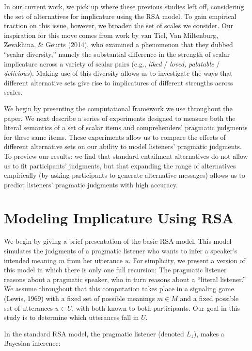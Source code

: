\documentclass[10pt, letterpaper]{article}
\begin{document}
In our current work, we pick up where these previous studies left off,
considering the set of alternatives for implicature using the RSA model.
To gain empirical traction on this issue, however, we broaden the set of
scales we consider. Our inspiration for this move comes from work by
{van Tiel}, Van Miltenburg, Zevakhina, \& Geurts (2014), who examined a
phenomenon that they dubbed ``scalar diversity,'' namely the substantial
difference in the strength of scalar implicature across a variety of
scalar pairs (e.g., \emph{liked} / \emph{loved,} \emph{palatable} /
\emph{delicious}). Making use of this diversity allows us to investigate
the ways that different alternative sets give rise to implicatures of
different strengths across scales.

We begin by presenting the computational framework we use throughout the
paper. We next describe a series of experiments designed to measure both
the literal semantics of a set of scalar items and comprehenders'
pragmatic judgments for these same items. These experiments allow us to
compare the effects of different alternative sets on our ability to
model listeners' pragmatic judgments. To preview our results: we find
that standard entailment alternatives do not allow us to fit
participants' judgments, but that expanding the range of alternatives
empirically (by asking participants to generate alternative messages)
allows us to predict listeners' pragmatic judgments with high accuracy.

\section{Modeling Implicature Using
RSA}\label{modeling-implicature-using-rsa}

We begin by giving a brief presentation of the basic RSA model. This
model simulates the judgments of a pragmatic listener who wants to infer
a speaker's intended meaning \(m\) from her utterance \(u\). For
simplicity, we present a version of this model in which there is only
one full recursion: The pragmatic listener reasons about a pragmatic
speaker, who in turn reasons about a ``literal listener.'' We assume
throughout that this computation takes place in a signaling game (Lewis,
1969) with a fixed set of possible meanings \(m \in M\) and a fixed
possible set of utterances \(u \in U\), with both known to both
participants. Our goal in this study is to determine which utterances
fall in \(U\).

In the standard RSA model, the pragmatic listener (denoted \(L_1\)),
makes a Bayesian inference:
\end{document}
